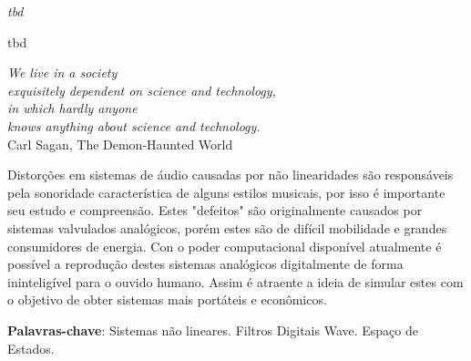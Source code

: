 
\begin{dedicatoria}
	\vspace*{\fill}
	\centering
	\noindent
	\textit{tbd} \vspace*{\fill}
\end{dedicatoria}


\begin{agradecimentos}
tbd
\end{agradecimentos}


\begin{epigrafe}
	\vspace*{\fill}
	\begin{flushright} 
		\textit{We live in a society \\ exquisitely dependent on science and technology,\\ in which hardly anyone \\ knows anything about science and technology.}\\ \vspace{\onelineskip}
		Carl Sagan, The Demon-Haunted World
	\end{flushright}
\end{epigrafe}


\setlength{\absparsep}{18pt} %
\begin{resumo}
	Distorções em sistemas de áudio causadas por não linearidades são responsáveis pela sonoridade característica de alguns estilos musicais, por isso é importante seu estudo e compreensão. Estes "defeitos" são originalmente causados por sistemas valvulados analógicos, porém estes são de difícil mobilidade e grandes consumidores de energia. Con o poder computacional disponível atualmente é possível a reprodução destes sistemas analógicos digitalmente de forma ininteligível para o ouvido humano. Assim é atraente a ideia de simular estes com o objetivo de obter sistemas mais portáteis e econômicos.

	\vspace{\onelineskip}
	\textbf{Palavras-chave}: Sistemas não lineares. Filtros Digitais Wave. Espaço de Estados.
\end{resumo}

